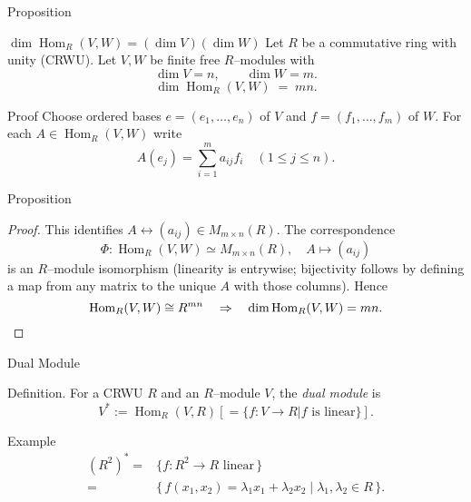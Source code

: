 
\date{22 October 2025}



\begin{frame}
  \cmctitleframe
\end{frame}

\begin{frame}{Proposition}
\vspace{-0.3cm}
\begin{block}{$\dim \operatorname{Hom}_R(V,W) = (\dim V)(\dim W)$}
Let $R$ be a commutative ring with unity (CRWU). Let $V,W$ be finite free $R$–modules with
\[
\dim V = n,\qquad \dim W = m.
\]
\[
\dim \operatorname{Hom}_R(V,W) \;=\; mn.
\]
\end{block}
\vspace{-0.3cm}
\begin{block}{Proof}
Choose ordered bases $e=(e_1,\dots,e_n)$ of $V$ and $f=(f_1,\dots,f_m)$ of $W$. For each $A\in \operatorname{Hom}_R(V,W)$ write
\[
A(e_j)=\sum_{i=1}^m a_{ij} f_i \quad (1\le j\le n).
\]
\end{block}

\end{frame}

\begin{frame}{Proposition}

\begin{proof}

This identifies $A \longleftrightarrow (a_{ij}) \in M_{m\times n}(R)$. The correspondence
\[
\Phi:\operatorname{Hom}_R(V,W) \simeq M_{m\times n}(R),\quad A\mapsto (a_{ij})
\]
is an $R$–module isomorphism (linearity is entrywise; bijectivity follows by defining a map from any matrix to the unique $A$ with those columns). Hence
\[
\operatorname{Hom}_R(V,W)\cong R^{mn}\quad\Rightarrow\quad \dim \operatorname{Hom}_R(V,W)=mn.\qedhere
\]
\end{proof}
\end{frame}

\begin{frame}{Dual Module}
\begin{block}{Definition.} For a CRWU $R$ and an $R$–module $V$, the \emph{dual module} is
\[
V^* := \operatorname{Hom}_R(V,R) \left[= \{f: V\to R|f\text{ is linear}\}\right].
\]
\end{block}
\begin{block}{Example}
\begin{align*}
(R^2)^*=&\{f:R^2\to R\text{ linear}\,\}\\
=&\{\,f(x_1,x_2)=\lambda_1 x_1+\lambda_2 x_2\mid \lambda_1,\lambda_2\in R\,\}.
\end{align*}

\end{block}
\end{frame}

